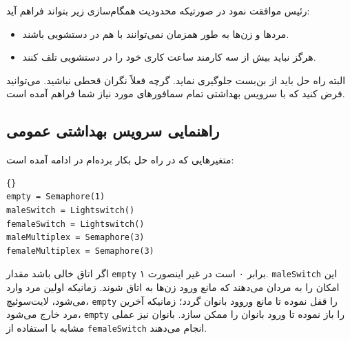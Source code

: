 \documentclass{book}
\newcommand{\clearemptydoublepage}{\newpage\cleardoublepage}
\begin{document}
    رئیس موافقت نمود در صورتیکه محدودیت همگام‌سازی زیر بتواند فراهم آید: 

\begin {itemize}

\item %
    مردها و زن‌ها به طور همزمان نمی‌توانند با هم در دستشویی باشند. 

\item %
    هرگز نباید بیش از سه کارمند ساعت کاری خود را در دستشویی تلف کنند. 
\end{itemize}

    البته راه حل باید از بن‌بست جلوگیری نماید. گرچه فعلاً نگران قحطی نباشید. می‌توانید فرض کنید که با سرویس بهداشتی تمام سمافورهای 
    مورد نیاز شما فراهم آمده است. 


\clearemptydoublepage
\subsection{راهنمایی سرویس بهداشتی عمومی}

    متغیرهایی که در راه حل بکار برده‌ام در ادامه آمده است:

\begin{latin}
\begin{latin}
\begin{lstlisting}[title=\rl{راهنمایی سرویس بهداشتی عمومی}]{}
empty = Semaphore(1)
maleSwitch = Lightswitch()
femaleSwitch = Lightswitch()
maleMultiplex = Semaphore(3)
femaleMultiplex = Semaphore(3)
\end{lstlisting}
\end{latin}
\end{latin}

     اگر اتاق خالی باشد مقدار {\tt empty} برابر ۰ است در غیر اینصورت ۱. 
    {\tt maleSwitch} 
    این امکان را به مردان می‌دهند که مانع ورود زن‌ها به اتاق شوند. زمانیکه اولین مرد وارد می‌شود، لایت‌سوئیچ، {\tt empty} را قفل نموده تا 
    مانع وروود بانوان گردد؛ زمانیکه آخرین مرد خارج می‌شود، {\tt empty} را باز نموده تا ورود بانوان را ممکن سازد. بانوان نیز 
    عملی مشابه با استفاده از {\tt femaleSwitch} انجام می‌دهند.
\end{document}
